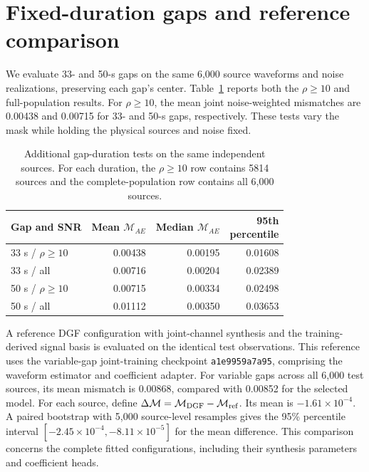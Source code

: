 \documentclass[10pt,prd,aps,a4paper,twocolumn,superscriptaddress,nofootinbib,floatfix]{revtex4-2}
\begin{document}
\section{Fixed-duration gaps and reference comparison}\label{app:fixed_gaps}
We evaluate 33- and 50-s gaps on the same 6,000 source waveforms and noise realizations, preserving each gap's center. Table~\ref{tab:fixed_gaps} reports both the $\rho\ge10$ and full-population results. For $\rho\ge10$, the mean joint noise-weighted mismatches are 0.00438 and 0.00715 for 33- and 50-s gaps, respectively. These tests vary the mask while holding the physical sources and noise fixed.
\begin{table}[t]\centering\setlength{\tabcolsep}{2pt}
\caption{Additional gap-duration tests on the same independent sources. For each duration, the $\rho\ge10$ row contains 5814 sources and the complete-population row contains all 6,000 sources.}\label{tab:fixed_gaps}
\begin{tabular}{lrrr}\hline\hline
Gap and SNR & Mean $\mathcal M_{AE}$ & Median $\mathcal M_{AE}$ & \shortstack{95th\\percentile}\\\hline
33 s / $\rho\ge10$ & 0.00438 & 0.00195 & 0.01608\\
33 s / all & 0.00716 & 0.00204 & 0.02389\\
50 s / $\rho\ge10$ & 0.00715 & 0.00334 & 0.02498\\
50 s / all & 0.01112 & 0.00350 & 0.03653\\
\hline\hline\end{tabular}\end{table}

A reference DGF configuration with joint-channel synthesis and the training-derived signal basis is evaluated on the identical test observations. This reference uses the variable-gap joint-training checkpoint \texttt{a1e9959a7a95}, comprising the waveform estimator and coefficient adapter. For variable gaps across all 6,000 test sources, its mean mismatch is 0.00868, compared with 0.00852 for the selected model. For each source, define $\Delta\mathcal M=\mathcal M_{\rm DGF}-\mathcal M_{\rm ref}$. Its mean is $-1.61\times10^{-4}$. A paired bootstrap with 5,000 source-level resamples gives the 95\% percentile interval $[-2.45\times10^{-4},-8.11\times10^{-5}]$ for the mean difference. This comparison concerns the complete fitted configurations, including their synthesis parameters and coefficient heads.
\end{document}
